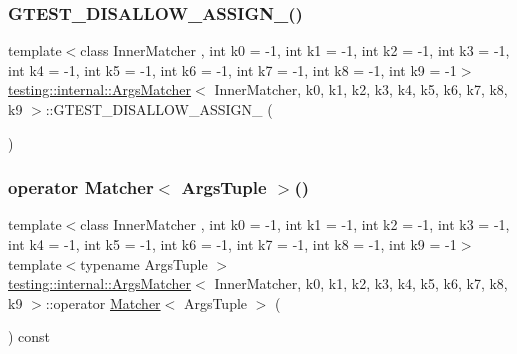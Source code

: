 \subsubsection{\texorpdfstring{GTEST\_DISALLOW\_ASSIGN\_()}{GTEST\_DISALLOW\_ASSIGN\_()}}
{\footnotesize\ttfamily template$<$class Inner\+Matcher , int k0 = -\/1, int k1 = -\/1, int k2 = -\/1, int k3 = -\/1, int k4 = -\/1, int k5 = -\/1, int k6 = -\/1, int k7 = -\/1, int k8 = -\/1, int k9 = -\/1$>$ \\
\mbox{\hyperlink{classtesting_1_1internal_1_1_args_matcher}{testing\+::internal\+::\+Args\+Matcher}}$<$ Inner\+Matcher, k0, k1, k2, k3, k4, k5, k6, k7, k8, k9 $>$\+::G\+T\+E\+S\+T\+\_\+\+D\+I\+S\+A\+L\+L\+O\+W\+\_\+\+A\+S\+S\+I\+G\+N\+\_\+ (\begin{DoxyParamCaption}\item[{\mbox{\hyperlink{classtesting_1_1internal_1_1_args_matcher}{Args\+Matcher}}$<$ Inner\+Matcher, k0, k1, k2, k3, k4, k5, k6, k7, k8, k9 $>$}]{ }\end{DoxyParamCaption})\hspace{0.3cm}{\ttfamily [private]}}

\mbox{\label{classtesting_1_1internal_1_1_args_matcher_ad55698b0de384a9d8875cef5b172cb4a}} 
\subsubsection{\texorpdfstring{operator Matcher$<$ ArgsTuple $>$()}{operator Matcher< ArgsTuple >()}}
{\footnotesize\ttfamily template$<$class Inner\+Matcher , int k0 = -\/1, int k1 = -\/1, int k2 = -\/1, int k3 = -\/1, int k4 = -\/1, int k5 = -\/1, int k6 = -\/1, int k7 = -\/1, int k8 = -\/1, int k9 = -\/1$>$ \\
template$<$typename Args\+Tuple $>$ \\
\mbox{\hyperlink{classtesting_1_1internal_1_1_args_matcher}{testing\+::internal\+::\+Args\+Matcher}}$<$ Inner\+Matcher, k0, k1, k2, k3, k4, k5, k6, k7, k8, k9 $>$\+::operator \mbox{\hyperlink{classtesting_1_1_matcher}{Matcher}}$<$ Args\+Tuple $>$ (\begin{DoxyParamCaption}{ }\end{DoxyParamCaption}) const\hspace{0.3cm}{\ttfamily [inline]}}



